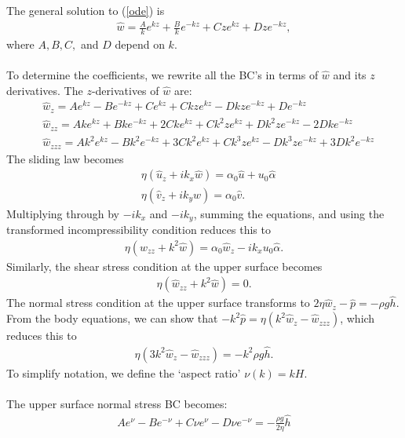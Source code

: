 \documentclass[paper=a4, fontsize=11pt]{article}
\begin{document}
The general solution to (\ref{ode}) is
\begin{align}
\widehat{w} = \frac{A}{k}e^{k z} + \frac{B}{k}e^{-k z} + {C}ze^{k z}+ {D}ze^{-k z},
\end{align}
where $A,B,C,$ and $D$ depend on $k$.\\ \\
To determine the coefficients, we rewrite all the BC's in terms of $\widehat{w}$ and its $z$ derivatives.
The $z$-derivatives of $\widehat{w}$ are:
\begin{align}
&\widehat{w}_{z} = {A}e^{k z} - {B}e^{-k z} + {C}e^{k z} + {C}kze^{k z} - {D}kze^{-k z} + {D}e^{-k z} \\
&\widehat{w}_{zz} = {Ak}e^{k z} + {Bk}e^{-k z} + {2Ck}e^{k z} + {C}k^2 ze^{k z} + {D}k^2ze^{-k z} - {2Dk}e^{-k z} \\
&\widehat{w}_{zzz} = {Ak^2}e^{k z} - {Bk^2}e^{-k z} + {3Ck^2}e^{k z} + {C}k^3 ze^{k z} - {D}k^3ze^{-k z} + {3Dk^2}e^{-k z}
\end{align}
The sliding law becomes
\begin{align}
&\eta( \widehat{u}_z + ik_x \widehat{w}) = \alpha_0\widehat{u} + u_0\widehat{\alpha} \\
&\eta( \widehat{v}_z + ik_y \widehat{w}) = \alpha_0\widehat{v}.
\end{align}
Multiplying through by $-ik_x$ and $-ik_y$, summing the equations, and using the transformed incompressibility
condition reduces this to
\begin{align}
\eta(\widehat{w}_{zz} + k^2 \widehat{w}) = \alpha_0 \widehat{w}_z - ik_x   u_0\widehat{\alpha}.
\end{align}
Similarly, the shear stress condition at the upper surface becomes
\begin{align}
\eta(\widehat{w}_{zz} + k^2 \widehat{w}) =  0.
\end{align}
The normal stress condition at the upper surface transforms to
$
2\eta \widehat{w}_{z} - \widehat{p} = -\rho g \widehat{h}.
$
From the body equations, we can show that
$-k^2 \widehat{p} = \eta(k^2\widehat{w}_z - \widehat{w}_{zzz}) $, which reduces this to
\begin{align}
\eta (3k^2 \widehat{w}_{z}-\widehat{w}_{zzz})  = -k^2 \rho g \widehat{h}.
\end{align}
To simplify notation, we define the `aspect ratio' $\nu(k) = kH$.\\ \\
The upper surface normal stress BC becomes:
\begin{align}
{A} e^{\nu} - {B} e^{-\nu} + {C}\nu e^{\nu} - {D}\nu e^{-\nu}
=- \frac{\rho g }{2\eta }\widehat{h} \label{b1}
\end{align}
\end{document}
